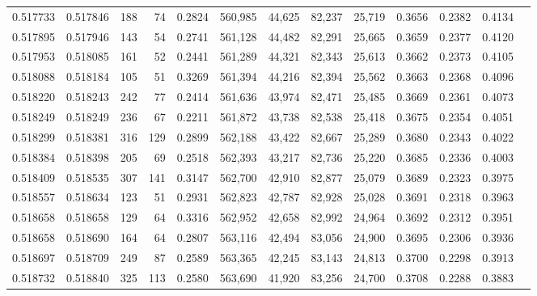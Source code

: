 \begin{tabular}{rrrrrrrrrrrrr}
0.517733 & 0.517846 &   188 &    74 &                                     0.2824 & 560,985 &  44,625 &  82,237 &  25,719 & 0.3656 & 0.2382 & 0.4134 \\
0.517895 & 0.517946 &   143 &    54 &                                     0.2741 & 561,128 &  44,482 &  82,291 &  25,665 & 0.3659 & 0.2377 & 0.4120 \\
0.517953 & 0.518085 &   161 &    52 &                                     0.2441 & 561,289 &  44,321 &  82,343 &  25,613 & 0.3662 & 0.2373 & 0.4105 \\
0.518088 & 0.518184 &   105 &    51 &                                     0.3269 & 561,394 &  44,216 &  82,394 &  25,562 & 0.3663 & 0.2368 & 0.4096 \\
0.518220 & 0.518243 &   242 &    77 &                                     0.2414 & 561,636 &  43,974 &  82,471 &  25,485 & 0.3669 & 0.2361 & 0.4073 \\
0.518249 & 0.518249 &   236 &    67 &                                     0.2211 & 561,872 &  43,738 &  82,538 &  25,418 & 0.3675 & 0.2354 & 0.4051 \\
0.518299 & 0.518381 &   316 &   129 &                                     0.2899 & 562,188 &  43,422 &  82,667 &  25,289 & 0.3680 & 0.2343 & 0.4022 \\
0.518384 & 0.518398 &   205 &    69 &                                     0.2518 & 562,393 &  43,217 &  82,736 &  25,220 & 0.3685 & 0.2336 & 0.4003 \\
0.518409 & 0.518535 &   307 &   141 &                                     0.3147 & 562,700 &  42,910 &  82,877 &  25,079 & 0.3689 & 0.2323 & 0.3975 \\
0.518557 & 0.518634 &   123 &    51 &                                     0.2931 & 562,823 &  42,787 &  82,928 &  25,028 & 0.3691 & 0.2318 & 0.3963 \\
0.518658 & 0.518658 &   129 &    64 &                                     0.3316 & 562,952 &  42,658 &  82,992 &  24,964 & 0.3692 & 0.2312 & 0.3951 \\
0.518658 & 0.518690 &   164 &    64 &                                     0.2807 & 563,116 &  42,494 &  83,056 &  24,900 & 0.3695 & 0.2306 & 0.3936 \\
0.518697 & 0.518709 &   249 &    87 &                                     0.2589 & 563,365 &  42,245 &  83,143 &  24,813 & 0.3700 & 0.2298 & 0.3913 \\
0.518732 & 0.518840 &   325 &   113 &                                     0.2580 & 563,690 &  41,920 &  83,256 &  24,700 & 0.3708 & 0.2288 & 0.3883 \\

\end{tabular}
